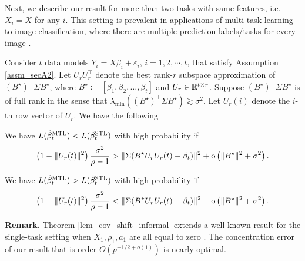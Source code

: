 Next, we describe our result for more than two tasks with same features, i.e. $X_i = X$ for any $i$.
This setting is prevalent in applications of multi-task learning to image classification, where there are multiple prediction labels/tasks for every image \cite{chexnet17,EA20}.
\begin{theorem}\label{thm_many_tasks}
	Consider $t$ data models $Y_i = X\beta_i + \varepsilon_i$, $i=1,2,\cdots, t$, that satisfy Assumption \ref{assm_secA2}.
	Let $U_r U_r^{\top}$ denote the best rank-$r$ subspace approximation of $(B^{\star})^\top\Sigma B^{\star}$, where $B^\star := [{\beta}_1,{\beta}_2,\dots,{\beta}_{t}]$ and $U_r\in\mathbb{R}^{t\times r}$. Suppose $(B^{\star})^\top\Sigma B^{\star}$ is of full rank in the sense that $\lambda_{\min}((B^{\star})^\top\Sigma B^{\star})\gtrsim \sigma^2$. Let $U_r(i)$ denote the $i$-th row vector of $U_r$.
	We have the following
	\squishlist
		\item We have $L(\hat{\beta}_t^{\text{MTL}}) < L(\hat{\beta}_t^{\text{STL}})$ with high probability if
		$$\left(1 - \|U_r(t)\|^2 \right)\frac{\sigma^2}{\rho - 1} > \|\Sigma (B^{\star} U_r U_r(t) - \beta_t)\|^2 +  \operatorname{o} \left( \|B^\star\|^2 + \sigma^2\right).$$
		\item We have $L(\hat{\beta}_t^{\text{MTL}}) > L(\hat{\beta}_t^{\text{STL}})$ with high probability if
		$$\left(1 - \|U_r(t)\|^2\right)\frac{\sigma^2}{\rho - 1} < \|\Sigma(B^{\star} U_r U_r(t) - \beta_t)\|^2 -  \operatorname{o} \left( \|B^\star\|^2 + \sigma^2\right).$$
	\squishend
\end{theorem}

\textbf{Remark.} Theorem \ref{lem_cov_shift_informal} extends a well-known result for the single-task setting when $X_1, \rho_1, a_1$ are all equal to zero \cite{S07}.
The concentration error of our result that is order $O(p^{-1/2+o(1)})$ is nearly optimal.

